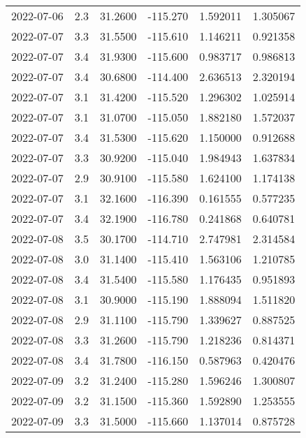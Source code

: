 \begin{tabular}{lrrrrr}
2022-07-06 &       2.3 &  31.2600 &  -115.270 &         1.592011 &         1.305067 \\
2022-07-07 &       3.3 &  31.5500 &  -115.610 &         1.146211 &         0.921358 \\
2022-07-07 &       3.4 &  31.9300 &  -115.600 &         0.983717 &         0.986813 \\
2022-07-07 &       3.4 &  30.6800 &  -114.400 &         2.636513 &         2.320194 \\
2022-07-07 &       3.1 &  31.4200 &  -115.520 &         1.296302 &         1.025914 \\
2022-07-07 &       3.1 &  31.0700 &  -115.050 &         1.882180 &         1.572037 \\
2022-07-07 &       3.4 &  31.5300 &  -115.620 &         1.150000 &         0.912688 \\
2022-07-07 &       3.3 &  30.9200 &  -115.040 &         1.984943 &         1.637834 \\
2022-07-07 &       2.9 &  30.9100 &  -115.580 &         1.624100 &         1.174138 \\
2022-07-07 &       3.1 &  32.1600 &  -116.390 &         0.161555 &         0.577235 \\
2022-07-07 &       3.4 &  32.1900 &  -116.780 &         0.241868 &         0.640781 \\
2022-07-08 &       3.5 &  30.1700 &  -114.710 &         2.747981 &         2.314584 \\
2022-07-08 &       3.0 &  31.1400 &  -115.410 &         1.563106 &         1.210785 \\
2022-07-08 &       3.4 &  31.5400 &  -115.580 &         1.176435 &         0.951893 \\
2022-07-08 &       3.1 &  30.9000 &  -115.190 &         1.888094 &         1.511820 \\
2022-07-08 &       2.9 &  31.1100 &  -115.790 &         1.339627 &         0.887525 \\
2022-07-08 &       3.3 &  31.2600 &  -115.790 &         1.218236 &         0.814371 \\
2022-07-08 &       3.4 &  31.7800 &  -116.150 &         0.587963 &         0.420476 \\
2022-07-09 &       3.2 &  31.2400 &  -115.280 &         1.596246 &         1.300807 \\
2022-07-09 &       3.2 &  31.1500 &  -115.360 &         1.592890 &         1.253555 \\
2022-07-09 &       3.3 &  31.5000 &  -115.660 &         1.137014 &         0.875728 \\

\end{tabular}
